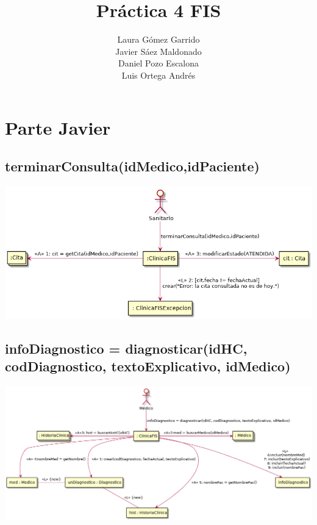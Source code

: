 \documentclass[10pt,a4paper,spanish]{report}
\title{\textbf{Práctica 4 FIS}}
\author{Laura Gómez Garrido\\
		Javier Sáez Maldonado\\
		Daniel Pozo Escalona\\
		Luis Ortega Andrés}
\begin{document}
\maketitle

\section*{Parte Javier}
\subsection*{terminarConsulta(idMedico,idPaciente)}
\begin{center}
	\includegraphics[scale=0.6]{terminarConsulta.png}
\end{center}

\subsection*{infoDiagnostico = diagnosticar(idHC, codDiagnostico, textoExplicativo, 
idMedico)}
\begin{center}
	\includegraphics[scale=0.4]{diagnosticar.png}
\end{center}
\end{document}
